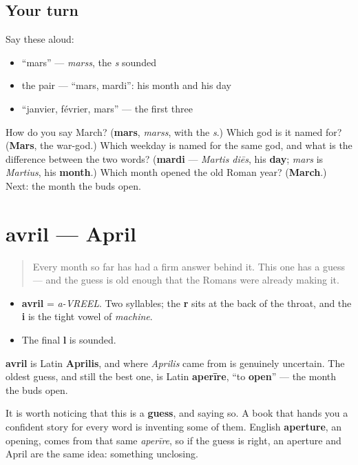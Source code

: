 \subsection*{Your turn}
Say these aloud:

\begin{itemize}
\raggedright
  \item \textquotedblleft{}mars\textquotedblright{} — \emph{marss}, the \emph{s} sounded
  \item the pair — \textquotedblleft{}mars, mardi\textquotedblright{}: his month and his day
  \item \textquotedblleft{}janvier, février, mars\textquotedblright{} — the first three
\end{itemize}

\begin{tcolorbox}[breakable,colback=teal!4,colframe=teal!35!black,title={Before you move on}]
How do you say March? (\textbf{mars}, \emph{marss}, with the \emph{s}.) Which god is it named for? (\textbf{Mars}, the war-god.) Which weekday is named for the same god, and what is the difference between the two words? (\textbf{mardi} — \emph{Martis diēs}, his \textbf{day}; \emph{mars} is \emph{Martius}, his \textbf{month}.) Which month opened the old Roman year? (\textbf{March}.) Next: the month the buds open.
\end{tcolorbox}
\section[avril]{avril — April}

\label{lesson:FR-C09-avril}



\begin{quote}
Every month so far has had a firm answer behind it. This one has a guess — and the guess is old enough that the Romans were already making it.
\end{quote}

\begin{sounds}
\begin{itemize}
\raggedright
  \item \textbf{avril} = \emph{a-VREEL}. Two syllables; the \textbf{r} sits at the back of the throat, and the \textbf{i} is the tight vowel of \emph{machine}.
  \item The final \textbf{l} is sounded.
\end{itemize}
\end{sounds}

\begin{cousinweb}
\textbf{avril} is Latin \textbf{Aprilis}, and where \emph{Aprilis} came from is genuinely uncertain. The oldest guess, and still the best one, is Latin \textbf{aperīre}, \textquotedblleft{}to \textbf{open}\textquotedblright{} — the month the buds open.

It is worth noticing that this is a \textbf{guess}, and saying so. A book that hands you a confident story for every word is inventing some of them. English \textbf{aperture}, an opening, comes from that same \emph{aperīre}, so if the guess is right, an aperture and April are the same idea: something unclosing.
\end{cousinweb}

